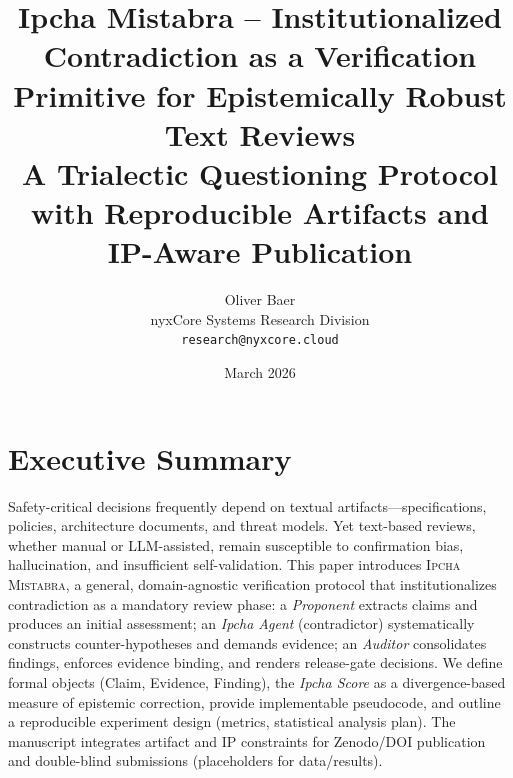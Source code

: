 \documentclass[11pt,a4paper]{article}
\title{\textbf{Ipcha Mistabra -- Institutionalized Contradiction as a Verification Primitive for Epistemically Robust Text Reviews}\\[4pt]
\large A Trialectic Questioning Protocol with Reproducible Artifacts and IP-Aware Publication}
\author{Oliver Baer\\nyxCore Systems Research Division\\\texttt{research@nyxcore.cloud}}
\date{March 2026}
\newcommand{\methodname}{\textsc{Ipcha Mistabra}}
\begin{document}
\maketitle

\section*{Executive Summary}
Safety-critical decisions frequently depend on textual artifacts---specifications, policies, architecture documents, and threat models.
Yet text-based reviews, whether manual or LLM-assisted, remain susceptible to confirmation bias, hallucination, and insufficient self-validation.
This paper introduces \methodname{}, a general, domain-agnostic verification protocol that institutionalizes contradiction as a mandatory review phase:
a \emph{Proponent} extracts claims and produces an initial assessment; an \emph{Ipcha Agent} (contradictor) systematically constructs counter-hypotheses and demands evidence; an \emph{Auditor} consolidates findings, enforces evidence binding, and renders release-gate decisions.
We define formal objects (Claim, Evidence, Finding), the \emph{Ipcha Score} as a divergence-based measure of epistemic correction, provide implementable pseudocode, and outline a reproducible experiment design (metrics, statistical analysis plan).
The manuscript integrates artifact and IP constraints for Zenodo/DOI publication and double-blind submissions (placeholders for data/results).
\end{document}
